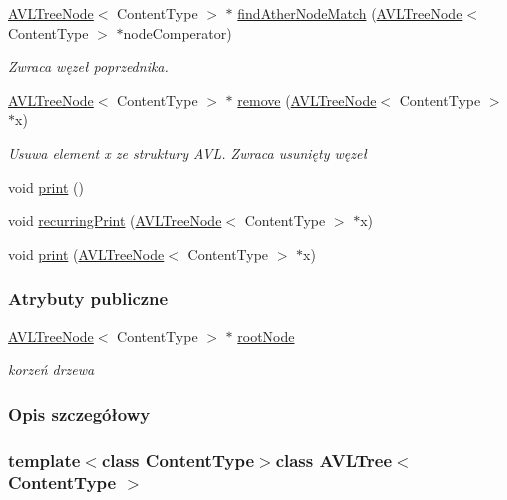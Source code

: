 \begin{DoxyCompactItemize}
\hyperlink{class_a_v_l_tree_node}{A\-V\-L\-Tree\-Node}$<$ Content\-Type $>$ $\ast$ \hyperlink{class_a_v_l_tree_aa776fe15518d516032ca6d4522d77b02}{find\-Ather\-Node\-Match} (\hyperlink{class_a_v_l_tree_node}{A\-V\-L\-Tree\-Node}$<$ Content\-Type $>$ $\ast$node\-Comperator)
\begin{DoxyCompactList}\small\item\em Zwraca węzeł poprzednika. \end{DoxyCompactList}\item 
\hyperlink{class_a_v_l_tree_node}{A\-V\-L\-Tree\-Node}$<$ Content\-Type $>$ $\ast$ \hyperlink{class_a_v_l_tree_ac7e22bd9f8cba3cd9eb8aea97ba7b654}{remove} (\hyperlink{class_a_v_l_tree_node}{A\-V\-L\-Tree\-Node}$<$ Content\-Type $>$ $\ast$x)
\begin{DoxyCompactList}\small\item\em Usuwa element x ze struktury A\-V\-L. Zwraca usunięty węzeł \end{DoxyCompactList}\item 
void \hyperlink{class_a_v_l_tree_ad440cb06acf157b57e161a797043aa8b}{print} ()
\item 
void \hyperlink{class_a_v_l_tree_a0440a3a88ac51df5191354562b58e375}{recurring\-Print} (\hyperlink{class_a_v_l_tree_node}{A\-V\-L\-Tree\-Node}$<$ Content\-Type $>$ $\ast$x)
\item 
void \hyperlink{class_a_v_l_tree_a6a2e6ca6bcdc814c246706f62150fe23}{print} (\hyperlink{class_a_v_l_tree_node}{A\-V\-L\-Tree\-Node}$<$ Content\-Type $>$ $\ast$x)
\end{DoxyCompactItemize}
\subsubsection*{Atrybuty publiczne}
\begin{DoxyCompactItemize}
\item 
\hyperlink{class_a_v_l_tree_node}{A\-V\-L\-Tree\-Node}$<$ Content\-Type $>$ $\ast$ \hyperlink{class_a_v_l_tree_aee3daa1b05e59d770a95e1274f09eb22}{root\-Node}
\begin{DoxyCompactList}\small\item\em korzeń drzewa \end{DoxyCompactList}\end{DoxyCompactItemize}


\subsubsection{Opis szczegółowy}
\subsubsection*{template$<$class Content\-Type$>$class A\-V\-L\-Tree$<$ Content\-Type $>$}



